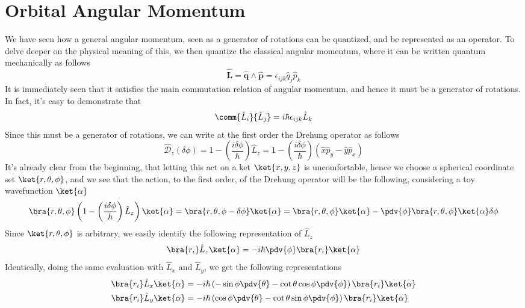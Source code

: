 \documentclass[a4paper, 11pt]{book}
\renewcommand{\vec}[1]{\mathbf{#1}}
\newcommand{\1}{\opr{\mathds{1}}}
\newcommand{\opr}[1]{\hat{#1}}
\newcommand{\lc}[1]{\epsilon_{#1}}
\newcommand{\mc}[1]{\mathcal{#1}}
\theoremstyle{plain}
\begin{document}
	\section{Orbital Angular Momentum}
	We have seen how a general angular momentum, seen as a generator of rotations can be quantized, and be represented as an operator. To delve deeper on the physical meaning of this, we then quantize the classical angular momentum, where it can be written quantum mechanically as follows
	\begin{equation}
		\opr{\vec{L}}=\opr{\vec{q}}\wedge\opr{\vec{p}}=\lc{ijk}\opr{q}_j\opr{p}_k
		\label{eq:orbangmom}
	\end{equation}
	It is immediately seen that it satisfies the main commutation relation of angular momentum, and hence it must be a generator of rotations. In fact, it's easy to demonstrate that
	\begin{equation}
		\comm{\opr{L}_i}{\opr{L}_j}=i\hbar\lc{ijk}\opr{L}_k
		\label{eq:commrelorbangmom}
	\end{equation}
	Since this must be a generator of rotations, we can write at the first order the Drehung operator as follows
	\begin{equation}
		\opr{\mc{D}}_z(\delta\phi)=1-\left( \frac{i\delta\phi}{\hbar} \right)\opr{L}_z=1-\left( \frac{i\delta\phi}{\hbar} \right)(\opr{x}\opr{p}_y-\opr{y}\opr{p}_x)
		\label{eq:drehungoplz}
	\end{equation}
	It's already clear from the beginning, that letting this act on a ket $\ket{x,y,z}$ is uncomfortable, hence we choose a spherical coordinate set $\ket{r,\theta,\phi}$, and we see that the action, to the first order, of the Drehung operator will be the following, considering a toy wavefunction $\ket{\alpha}$
	\begin{equation}
		\bra{r,\theta,\phi}\left( 1-\left( \frac{i\delta\phi}{\hbar} \right)\opr{L}_z \right)\ket{\alpha}=\bra{r,\theta,\phi-\delta\phi}\ket{\alpha}=\bra{r,\theta,\phi}\ket{\alpha}-\pdv{\phi}\bra{r,\theta,\phi}\ket{\alpha}\delta\phi
		\label{eq:actionlz}
	\end{equation}
	Since $\ket{r,\theta,\phi}$ is arbitrary, we easily identify the following representation of $\opr{L}_z$
	\begin{equation}
		\bra{r_i}\opr{L}_z\ket{\alpha}=-i\hbar\pdv{\phi}\bra{r_i}\ket{\alpha}
		\label{eq:lzrepresentation}
	\end{equation}
	Identically, doing the same evaluation with $\opr{L}_x$ and $\opr{L}_y$, we get the following representations
	\begin{equation}
		\begin{aligned}
			\bra{r_i}\opr{L}_x\ket{\alpha}&=-i\hbar\left( -\sin\phi\pdv{\theta}-\cot\theta\cos\phi\pdv{\phi} \right)\bra{r_i}\ket{\alpha}\\
			\bra{r_i}\opr{L}_y\ket{\alpha}&=-i\hbar\left( \cos\phi\pdv{\theta}-\cot\theta\sin\phi\pdv{\phi} \right)\bra{r_i}\ket{\alpha}
		\end{aligned}
		\label{eq:lxlyrep}
	\end{equation}
\end{document}
